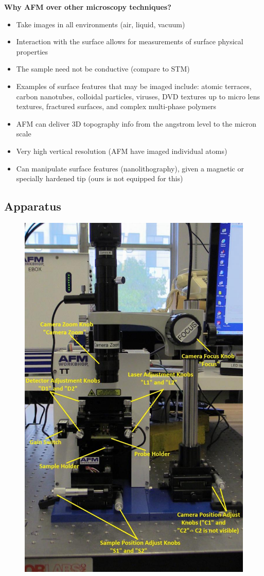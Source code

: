 \documentclass{../lab}
\begin{document}
\noindent\textbf{Why AFM over other microscopy techniques?}
\begin{itemize}
    \item Take images in all environments (air, liquid, vacuum)

    \item Interaction with the surface allows for measurements of surface physical properties

    \item The sample need not be conductive (compare to STM)

    \item Examples of surface features that may be imaged include: atomic terraces, carbon nanotubes, colloidal particles, viruses, DVD textures up to micro lens textures, fractured surfaces, and complex multi-phase polymers

    \item AFM can deliver 3D topography info from the angstrom level to the micron scale

    \item Very high vertical resolution (AFM have imaged individual atoms)

    \item Can manipulate surface features (nanolithography), given a magnetic or specially hardened tip (ours is not equipped for this)

\end{itemize}

\subsection{Apparatus}

\begin{figure}[h]
    \centering
    \href{http://experimentationlab.berkeley.edu/sites/default/files/AFMImages/AFMgen.jpg}{\includegraphics[width=0.5\linewidth]{images/AFMgen.jpg}}
    \label{fig:AFMgen}
\end{figure}
\end{document}

